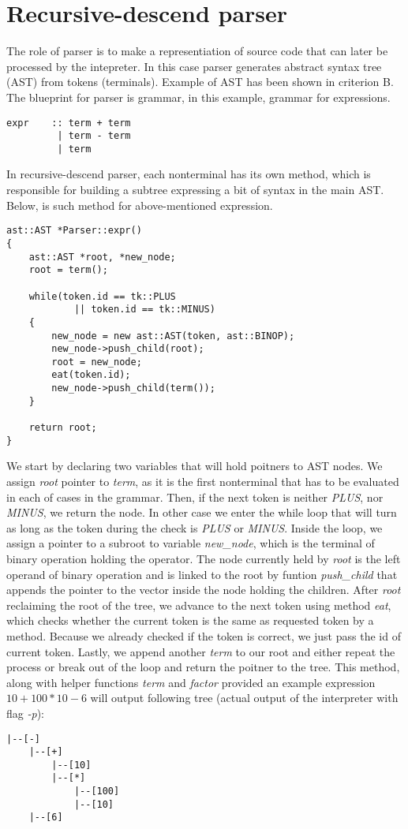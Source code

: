 \documentclass{article}
\begin{document}
\section{Recursive-descend parser}
    
    The role of parser is to make a representiation of source code that can later
    be processed by the intepreter. In this case parser generates abstract
    syntax tree (AST) from tokens (terminals). Example of AST has been shown in 
    criterion B.
    The blueprint for parser is grammar, in this example, grammar for expressions.
    \begin{verbatim}
expr    :: term + term
         | term - term
         | term
    \end{verbatim}
    In recursive-descend parser, each nonterminal has its own method, which is
    responsible for building a subtree expressing a bit of syntax in the main AST.
    Below, is such method for above-mentioned expression.
    \begin{verbatim}
ast::AST *Parser::expr()
{
    ast::AST *root, *new_node;
    root = term();

    while(token.id == tk::PLUS 
            || token.id == tk::MINUS)
    {
        new_node = new ast::AST(token, ast::BINOP);
        new_node->push_child(root);
        root = new_node;
        eat(token.id);
        new_node->push_child(term());
    }

    return root;
}
    \end{verbatim}
    We start by declaring two variables that will hold poitners to AST nodes.
    We assign \emph{root} pointer to \emph{term}, as it is the first nonterminal 
    that has to be evaluated in each of cases in the grammar. Then, if the next 
    token is neither \emph{PLUS}, nor \emph{MINUS}, we return the node. In other 
    case we enter the while loop that will turn as long as the token during the 
    check is \emph{PLUS} or \emph{MINUS}. Inside the loop, we assign a pointer to 
    a subroot to variable \emph{new\_node}, which is the terminal of binary 
    operation holding the operator. The node currently held by \emph{root} is 
    the left operand of binary operation and is linked to the root by funtion 
    \emph{push\_child} that appends the pointer to the vector inside the node 
    holding the children. After \emph{root} reclaiming the root of the tree, we 
    advance to the next token using method \emph{eat}, which checks whether the 
    current token is the same as requested token by a method. Because we already 
    checked if the token is correct, we just pass the id of current token. Lastly, 
    we append another \emph{term} to our root and either repeat the process or 
    break out of the loop and return the poitner to the tree. This method, along with 
    helper functions \emph{term} and \emph{factor} provided an example expression 
    $10 + 100 * 10 - 6$ will output following tree (actual output of the 
    interpreter with flag \emph{-p}):
    \begin{verbatim}
|--[-]               
    |--[+]        
        |--[10]   
        |--[*]     
            |--[100]
            |--[10] 
    |--[6]        
    \end{verbatim}
\end{document}
